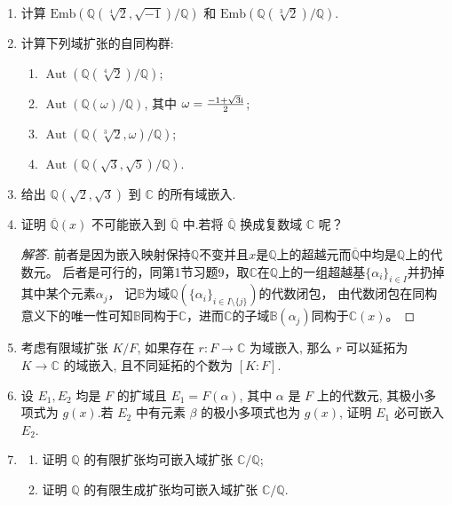 \begin{enumerate}
\item 计算 $\text{Emb}(\mathbb{Q}(\sqrt[4]{2}, \sqrt{-1})/\mathbb{Q})$ 和 $\text{Emb}(\mathbb{Q}(\sqrt[3]{2})/\mathbb{Q})$.

\item 计算下列域扩张的自同构群:
\begin{enumerate}[label=(\arabic*)]
    \item $\operatorname{Aut}(\mathbb{Q}(\sqrt[4]{2})/\mathbb{Q})$;
    \item $\operatorname{Aut}(\mathbb{Q}(\omega)/\mathbb{Q})$, 其中 $\omega = \frac{-1 + \sqrt{3}{\rm i}}{2}$;
    \item $\operatorname{Aut}(\mathbb{Q}(\sqrt[3]{2}, \omega)/\mathbb{Q})$;
    \item $\operatorname{Aut}(\mathbb{Q}(\sqrt{3}, \sqrt{5})/\mathbb{Q})$.
\end{enumerate}

\item 给出 $\mathbb{Q}(\sqrt{2}, \sqrt{3})$ 到 $\mathbb{C}$ 的所有域嵌入.

\item 证明 $\overline{\mathbb{Q}}(x)$ 不可能嵌入到 $\overline{\mathbb{Q}}$ 中.若将 $\overline{\mathbb{Q}}$ 换成复数域 $\mathbb{C}$ 呢？
\begin{proof}[解答]
    前者是因为嵌入映射保持$\mathbb{Q}$不变并且$x$是$\mathbb{Q}$上的超越元而$\overline{\mathbb{Q}}$中均是$\mathbb{Q}$上的代数元。
    后者是可行的，同第1节习题9，取$\mathbb{C}$在$\mathbb{Q}$上的一组超越基$\{\alpha_i\}_{i \in I}$并扔掉其中某个元素$\alpha_j$，
    记$\mathbb{B}$为域$\mathbb{Q}(\{\alpha_i\}_{i \in I\setminus\{j\}})$的代数闭包，
    由代数闭包在同构意义下的唯一性可知$\mathbb{B}$同构于$\mathbb{C}$，进而$\mathbb{C}$的子域$\mathbb{B}(\alpha_j)$同构于$\mathbb{C}(x)$。
\end{proof}
\item 考虑有限域扩张 $K/F$, 如果存在 $r: F \rightarrow \mathbb{C}$ 为域嵌入, 那么 $r$ 可以延拓为 $K \rightarrow \mathbb{C}$ 的域嵌入, 且不同延拓的个数为 $[K:F]$.

\item 设 $E_1, E_2$ 均是 $F$ 的扩域且 $E_1 = F(\alpha)$, 其中 $\alpha$ 是 $F$ 上的代数元, 其极小多项式为 $g(x)$.若 $E_2$ 中有元素 $\beta$ 的极小多项式也为 $g(x)$, 证明 $E_1$ 必可嵌入 $E_2$.

\item 
\begin{enumerate}[label=(\arabic*)]
    \item 证明 $\mathbb{Q}$ 的有限扩张均可嵌入域扩张 $\mathbb{C}/\mathbb{Q}$;
    \item 证明 $\mathbb{Q}$ 的有限生成扩张均可嵌入域扩张 $\mathbb{C}/\mathbb{Q}$.
\end{enumerate}


\end{enumerate}
